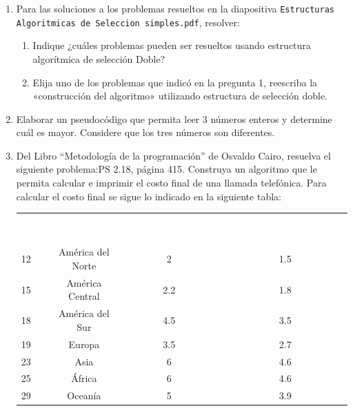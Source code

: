 \documentclass[spanish,11pt,twoside]{article}
\newcommand{\head}[1]{ %
	\textcolor{white}{\textbf{#1}}}
\renewcommand{\arraystretch}{1.5} %
\providecommand{\tightlist}{%
	\setlength{\itemsep}{3pt}\setlength{\parskip}{10pt}}
\begin{document}
\begin{enumerate}
	\tightlist %
	\item Para las soluciones a los problemas resueltos en la diapositiva \texttt{Estructuras Algoritmicas de Seleccion simples.pdf}, resolver:
	\begin{enumerate}
		\tightlist
		\item Indique ¿cuáles problemas pueden ser resueltos usando estructura algorítmica de selección Doble?
		\item Elija uno de los problemas que indicó en la pregunta 1, reescriba la «construcción del algoritmo» utilizando estructura de selección doble.
	\end{enumerate}
	

	\item Elaborar un pseudocódigo que permita leer 3 números enteros y determine cuál es mayor. Considere que los tres números son diferentes.	
	
	
	\item Del Libro ``Metodología de la programación'' de Osvaldo Cairo, resuelva el siguiente
	problema:\textsf{PS 2.18, página 415}. Construya un algoritmo que le permita calcular e imprimir el costo final de una llamada telefónica. Para calcular el costo final se sigue lo indicado en la siguiente tabla:
	
	\begin{table}[H]%
		\renewcommand{\arraystretch}{1.5} %
		\centering\footnotesize%
		\sffamily%
		
		\label{table:problemas:llamada}
		\begin{tabular}{lccc}
			\rowcolor{uasblue}%
			\head{Clave}& \head{Zona} 		& \head{Precio/Minuto (3 primeros)} & \head{Precio/Minuto (del 4to en adelante)}\\
			12 			& América del Norte	& 2									& 1.5 \\
			15			& América Central	& 2.2								& 1.8 \\
			18			& América del Sur	& 4.5								& 3.5 \\
			19			& Europa			& 3.5								& 2.7 \\
			23			& Asia				& 6									& 4.6 \\
			25			& África			& 6									& 4.6 \\
			29			& Oceanía			& 5									& 3.9 \\
		\end{tabular}
	\end{table}
	
\end{enumerate}
\end{document}
